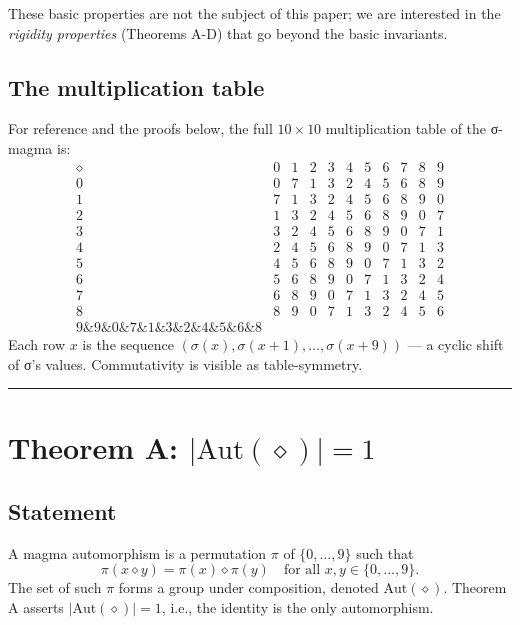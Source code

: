 \documentclass[11pt,reqno]{amsart}
\theoremstyle{plain}
\theoremstyle{definition}
\begin{document}
These basic properties are not the subject of this paper; we are interested in the \textit{rigidity properties} (Theorems A-D) that go beyond the basic invariants.

\subsection{The multiplication table}

For reference and the proofs below, the full $10 \times 10$ multiplication table of the σ-magma is:
$$
\begin{array}{c|cccccccccc}
\diamond & 0 & 1 & 2 & 3 & 4 & 5 & 6 & 7 & 8 & 9 \\
\hline
0 & 0 & 7 & 1 & 3 & 2 & 4 & 5 & 6 & 8 & 9 \\
1 & 7 & 1 & 3 & 2 & 4 & 5 & 6 & 8 & 9 & 0 \\
2 & 1 & 3 & 2 & 4 & 5 & 6 & 8 & 9 & 0 & 7 \\
3 & 3 & 2 & 4 & 5 & 6 & 8 & 9 & 0 & 7 & 1 \\
4 & 2 & 4 & 5 & 6 & 8 & 9 & 0 & 7 & 1 & 3 \\
5 & 4 & 5 & 6 & 8 & 9 & 0 & 7 & 1 & 3 & 2 \\
6 & 5 & 6 & 8 & 9 & 0 & 7 & 1 & 3 & 2 & 4 \\
7 & 6 & 8 & 9 & 0 & 7 & 1 & 3 & 2 & 4 & 5 \\
8 & 8 & 9 & 0 & 7 & 1 & 3 & 2 & 4 & 5 & 6 \\
9 \& 9 \& 0 \& 7 \& 1 \& 3 \& 2 \& 4 \& 5 \& 6 \& 8
\end{array}
$$
Each row $x$ is the sequence $(\sigma(x), \sigma(x+1), \ldots, \sigma(x+9))$ --- a cyclic shift of σ's values. Commutativity is visible as table-symmetry.

\medskip\hrule\medskip

\section{Theorem A: $|\mathrm{Aut}(\diamond)| = 1$}

\subsection{Statement}

A magma automorphism is a permutation $\pi$ of $\{0, \ldots, 9\}$ such that
$$
\pi(x \diamond y) = \pi(x) \diamond \pi(y) \quad \text{for all } x, y \in \{0, \ldots, 9\}.
$$
The set of such $\pi$ forms a group under composition, denoted $\mathrm{Aut}(\diamond)$. Theorem A asserts $|\mathrm{Aut}(\diamond)| = 1$, i.e., the identity is the only automorphism.
\end{document}
